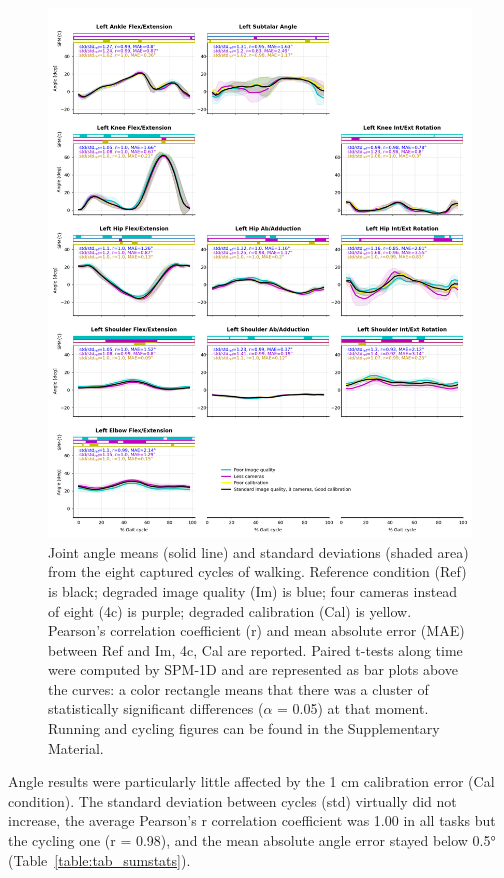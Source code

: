 \begin{figure}[!ht]
	\centering
	\def\svgwidth{1\columnwidth}
	\fontsize{10pt}{10pt}\selectfont
	\includegraphics[height=\dimexpr\textheight-119pt]{"../Chap4/Figures/Fig_WalkRobust.png"}
	\caption{Joint angle means (solid line) and standard deviations (shaded area) from the eight captured cycles of walking. Reference condition (Ref) is black; degraded image quality (Im) is blue; four cameras instead of eight (4c) is purple; degraded calibration (Cal) is yellow. Pearson’s correlation coefficient (r) and mean absolute error (MAE) between Ref and Im, 4c, Cal are reported. Paired t-tests along time were computed by SPM-1D and are represented as bar plots above the curves: a color rectangle means that there was a cluster of statistically significant differences (\(\alpha\) = 0.05) at that moment. Running and cycling figures can be found in the Supplementary Material.}
	\label{fig_walkrobust}
\end{figure}

Angle results were particularly little affected by the 1 cm calibration error (Cal condition). The standard deviation between cycles (std) virtually did not increase, the average Pearson’s r correlation coefficient was 1.00 in all tasks but the cycling one (r = 0.98), and the mean absolute angle error stayed below 0.5° (Table~\ref{table:tab_sumstats}).

